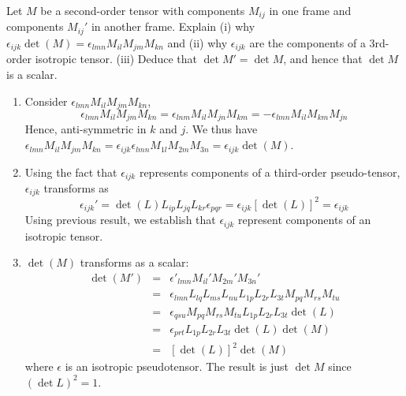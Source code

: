 \documentclass[a4paper]{article}
\begin{document}
\begin{qns}[Determinant]
Let $M$ be a second-order tensor with components $M_{ij}$ in one frame and components $M_{ij}'$ in another frame. Explain (i) why $\epsilon_{ijk}\det(M)=\epsilon_{lmn}M_{il}M_{jm}M_{kn}$ and (ii) why
$\epsilon_{ijk}$ are the components of a 3rd-order isotropic tensor. (iii) Deduce that $\det M'=\det M$, and hence that $\det M$ is a scalar.
\end{qns}
\begin{ans}\leavevmode
\begin{enumerate}[label=(\roman*)]
\item Consider $\epsilon_{lmn}M_{il}M_{jm}M_{kn}$,
$$\epsilon_{lmn}M_{il}M_{jm}M_{kn}=\epsilon_{lnm}M_{il}M_{jn}M_{km}=-\epsilon_{lmn}M_{il}M_{km}M_{jn}$$
Hence, anti-symmetric in $k$ and $j$. We thus have $\epsilon_{lmn}M_{il}M_{jm}M_{kn}=\epsilon_{ijk}\epsilon_{lmn}M_{1l}M_{2m}M_{3n}=\epsilon_{ijk}\det(M)$. \item Using the fact that $\epsilon_{ijk}$ represents components of a third-order pseudo-tensor, $\epsilon_{ijk}$ transforms as
$$\epsilon_{ijk}'=\det(L)L_{ip}L_{jq}L_{kr}\epsilon_{pqr}=\epsilon_{ijk}[\det(L)]^2=\epsilon_{ijk}$$
Using previous result, we establish that $\epsilon_{ijk}$ represent components of an isotropic tensor.
\item $\det(M)$ transforms as a scalar:
\begin{eqnarray}
\det(M')&=&\epsilon'_{lmn}M_{il}'M_{2m}'M_{3n}'\nonumber\\&=&\epsilon_{lmn}L_{lq}L_{ms}L_{nu}L_{1p}L_{2r}L_{3t}M_{pq}M_{rs}M_{tu}\nonumber\\&=&\epsilon_{qsu}M_{pq}M_{rs}M_{tu}L_{1p}L_{2r}L_{3t}\det(L)\nonumber\\&=&\epsilon_{prt}L_{1p}L_{2r}L_{3t}\det(L)\det(M)\nonumber\\&=&[\det(L)]^2\det(M)\nonumber
\end{eqnarray}
where $\epsilon$ is an isotropic pseudotensor. The result is just $\det M$ since $(\det L)^2=1$.
\end{enumerate}
\end{ans}
\end{document}
